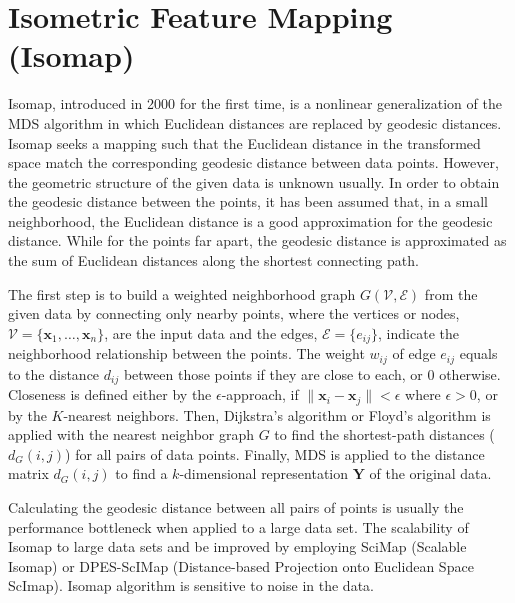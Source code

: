 \section{Isometric Feature Mapping (Isomap)\label{Sec:DR:Isomap}}
Isomap, introduced in 2000 for the first time, is a nonlinear generalization of the MDS algorithm in which Euclidean distances are replaced by geodesic distances.\cite{TenenhaumScience2000} Isomap seeks a mapping such that the Euclidean distance in the transformed space match the corresponding geodesic distance between data points. However, the geometric structure of the given data is unknown usually. In order to obtain the geodesic distance between the points, it has been assumed that, in a small neighborhood, the Euclidean distance is a good approximation for the geodesic distance. While for the points far apart, the geodesic distance is approximated as the sum of Euclidean distances along the shortest connecting path.

The first step is to build a weighted neighborhood graph $G(\mathcal{V},\mathcal{E})$ from the given data by connecting only nearby points, where the vertices or nodes, $\mathcal{V}=\{\mathbf{x}_1,\dots,\mathbf{x}_n\}$, are the input data and the edges, $\mathcal{E}=\{e_{ij}\}$, indicate the neighborhood relationship between the points. The weight $w_{ij}$ of edge $e_{ij}$ equals to the distance $d_{ij}$ between those points if they are close to each, or $0$ otherwise. Closeness is defined either by the $\epsilon$-approach, if $\lVert\mathbf{x}_i-\mathbf{x}_j\rVert<\epsilon$ where $\epsilon >0$, or by the $K$-nearest neighbors. Then, Dijkstra’s algorithm or Floyd's algorithm is applied with the nearest neighbor graph $G$ to find the shortest-path distances ($d_G(i,j)$) for all pairs of data points. Finally, MDS is applied to the distance matrix $d_G(i,j)$ to find a $k$-dimensional representation $\mathbf{Y}$ of the original data.

Calculating the geodesic distance between all pairs of points is usually the performance bottleneck when applied to a large data set. The scalability of Isomap to large data sets and be improved by employing SciMap (Scalable Isomap)\cite{DasPNAS2006} or DPES-ScIMap (Distance-based Projection onto Euclidean Space ScImap).\cite{PlakuProteins2007} Isomap algorithm is sensitive to noise in the data.